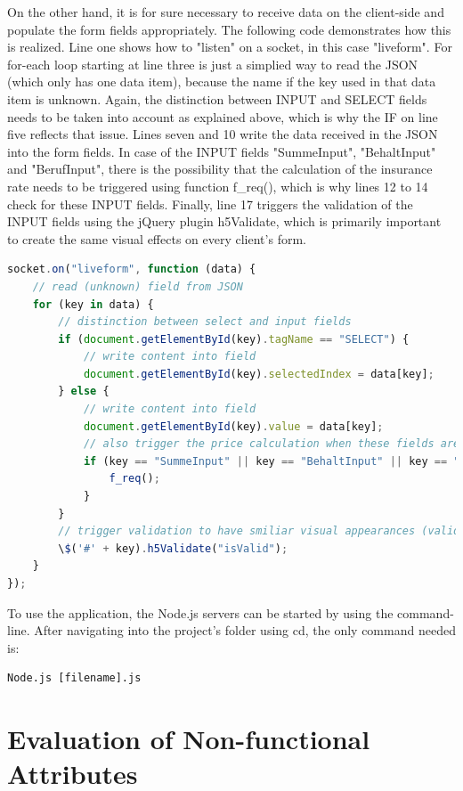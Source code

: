 On the other hand, it is for sure necessary to receive data on the client-side and populate the form fields appropriately. The following code demonstrates how this is realized. Line one shows how to "listen" on a socket, in this case "liveform". For for-each loop starting at line three is just a simplied way to read the JSON (which only has one data item), because the name if the key used in that data item is unknown. Again, the distinction between INPUT and SELECT fields needs to be taken into account as explained above, which is why the IF on line five reflects that issue. Lines seven and 10 write the data received in the JSON into the form fields. In case of the INPUT fields "SummeInput", "BehaltInput" and "BerufInput", there is the possibility that the calculation of the insurance rate needs to be triggered using function f\_req(), which is why lines 12 to 14 check for these INPUT fields. Finally, line 17 triggers the validation of the INPUT fields using the jQuery plugin h5Validate, which is primarily important to create the same visual effects on every client's form.

\begin{lstlisting}[language=javascript,caption={Receiving data using WebSockets}]
socket.on("liveform", function (data) {
    // read (unknown) field from JSON
    for (key in data) {
        // distinction between select and input fields
        if (document.getElementById(key).tagName == "SELECT") {
            // write content into field
            document.getElementById(key).selectedIndex = data[key];
        } else {
            // write content into field
            document.getElementById(key).value = data[key];
            // also trigger the price calculation when these fields are filled
            if (key == "SummeInput" || key == "BehaltInput" || key == "BerufInput") {
                f_req();
            }
        }
        // trigger validation to have smiliar visual appearances (valid/invalid) for the fields
        \$('#' + key).h5Validate("isValid");
    }
});
\end{lstlisting}

To use the application, the Node.js servers can be started by using the command-line. After navigating
into the project’s folder using cd, the only command needed is:
\begin{lstlisting}[caption={Executing Node.js code}]
Node.js [filename].js
\end{lstlisting}

\newpage
\section{Evaluation of Non-functional Attributes}
\label{evaluation_nonfunctional}


